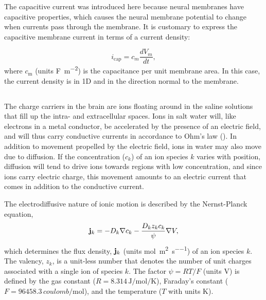 The capacitive current was introduced here because neural membranes have capacitive properties, which causes the neural membrane potential to change when currents pass through the membrane. It is customary to express the capacitive membrane current in terms of a current density:

\begin{equation}
i_\text{cap} = c_m\frac{dV_m}{dt},
\label{eq:Basics:Icap_mem}
\end{equation}
where $c_\text{m}$ (units \si{\farad\per\square\metre}) is the capacitance per unit membrane area. In this case, the current density is in 1D and in the direction normal to the membrane.


\subsection{}
\label{sec:Basics:DiffusiveCurrent}
 
The charge carriers in the brain are ions floating around in the saline solutions that fill up the intra- and extracellular spaces. Ions in salt water will, like electrons in a metal conductor, be accelerated by the presence of an electric field, and will thus carry conductive currents in accordance to Ohm's law (). In addition to movement propelled by the electric field, ions in water may also move due to diffusion. If the concentration ($c_k$) of an ion species $k$ varies with position, diffusion will tend to drive ions towards regions with low concentration, and since ions carry electric charge, this movement amounts to an electric current that comes in addition to the conductive current. 

The electrodiffusive  nature of ionic motion is described by the Nernst-Planck equation,
\begin{equation}
{\bf j}_k = - D_k {\bf \nabla} c_{k} - \frac{D_k z_k c_k}{\psi} {\bf \nabla} V,
\label{eq:Basics:JNP}
\end{equation}
which determines the flux density, ${\bf j}_k$ (units \si{\mole\per\square\metre\per\second}) of an ion species $k$. The valency, $z_{k}$, is a unit-less number that denotes the number of unit charges associated with a single ion of species $k$. The factor $\psi=RT/F$ (units \si{\volt}) is defined by the gas constant ($R = 8.314 \, \si{\joule\per\mole\per\kelvin}$), Faraday's constant ($F = 96458.3\, \si{coulomb\per\mole}$), and the temperature ($T$ with units \si{\kelvin}).

